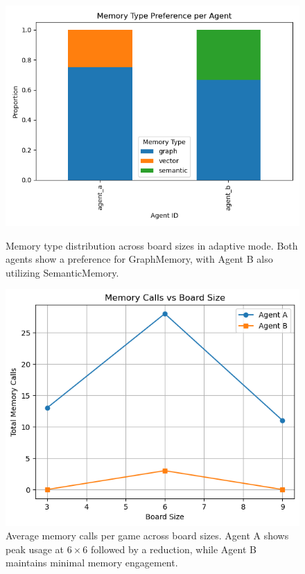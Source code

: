 \documentclass[10pt]{article}
\begin{document}
\begin{figure}[ht]
\centering
\begin{minipage}{0.48\textwidth}
  \centering
  \includegraphics[width=\textwidth]{figures/adaptive/memory_type_preference.png}
  \caption{Memory type distribution across board sizes in adaptive mode. Both agents show a preference for GraphMemory, with Agent B also utilizing SemanticMemory.}
  \label{fig:adaptive_memory_type}
\end{minipage}%
\hfill
\begin{minipage}{0.48\textwidth}
  \centering
  \includegraphics[width=\textwidth]{figures/adaptive/memory_calls_vs_board_size.png}
  \caption{Average memory calls per game across board sizes. Agent A shows peak usage at $6\times6$ followed by a reduction, while Agent B maintains minimal memory engagement.}
  \label{fig:adaptive_memory_frequency}
\end{minipage}
\end{figure}
\end{document}
